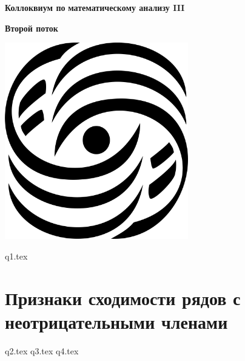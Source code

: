\documentclass{book}
\begin{document}
	
	
	\begin{titlepage}
		\centering
		
		\vspace*{2cm}
		
		{\Huge\bfseries Коллоквиум по}
		{\Huge\bfseries математическому анализу III}
		
		{\Huge\bfseries Второй поток}
		
		\vspace*{2.2cm}
		
		\includegraphics[width=0.6\textwidth]{logo.png}
	\end{titlepage}
	
	\thispagestyle{empty}
	\tableofcontents
	\thispagestyle{empty}
	\clearpage
	
	\pagestyle{fancy}
	\setcounter{page}{1}
	\fancyhf{}
	\fancyhead[LE]{\thepage}
	\fancyhead[RO]{\thepage}
	
	{q1.tex}
	\section*{Признаки сходимости рядов с неотрицательными членами}
	{q2.tex}
	{q3.tex}
	{q4.tex}	
	
\end{document}
